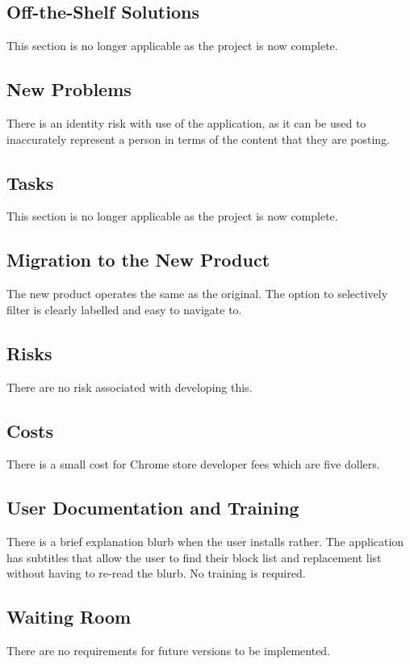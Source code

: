 \documentclass[12pt, titlepage]{article}
\begin{document}
\subsection{Off-the-Shelf Solutions}
This section is no longer applicable as the project is now complete.

\subsection{New Problems}
There is an identity risk with use of the application, as it can be used to inaccurately represent a person in terms of the content that they are posting.

\subsection{Tasks}
This section is no longer applicable as the project is now complete.
\subsection{Migration to the New Product}
The new product operates the same as the original. The option to selectively filter is clearly labelled and easy to navigate to.

\subsection{Risks}
There are no risk associated with developing this.

\subsection{Costs}
There is a small cost for Chrome store developer fees which are five dollers.

\subsection{User Documentation and Training}
There is a brief explanation blurb when the user installs rather. The application has subtitles that allow the user to find their block list and replacement list without having to re-read the blurb. No training is required.

\subsection{Waiting Room}
There are no requirements for future versions to be implemented.
\end{document}
